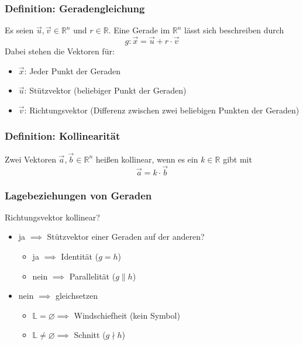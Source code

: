\documentclass{article}
\begin{document}
  \subsubsection{Definition: Geradengleichung}
  Es seien $\vec{u}, \vec{v} \in \mathbb{R}^n$ und $r \in \mathbb{R}$. Eine Gerade im $\mathbb{R}^n$ lässt sich beschreiben durch 
  \begin{equation*}
  	g : \vec{x} = \vec{u} + r \cdot \vec{v}
  \end{equation*}
  Dabei stehen die Vektoren für: 
  \begin{itemize}
  	\item $\vec{x}$: Jeder Punkt der Geraden
  	\item $\vec{u}$: Stützvektor (beliebiger Punkt der Geraden)
  	\item $\vec{v}$: Richtungsvektor (Differenz zwischen zwei beliebigen Punkten der Geraden)
  \end{itemize}
  
  \subsubsection{Definition: Kollinearität}
  Zwei Vektoren $\vec{a}, \vec{b} \in \mathbb{R}^n$ heißen kollinear, wenn es ein $k \in \mathbb{R}$ gibt mit 
  \begin{equation*}
  	\vec{a} = k \cdot \vec{b}
  \end{equation*}
  
  \subsubsection{Lagebeziehungen von Geraden}
  Richtungsvektor kollinear? 
  \begin{itemize}
  	\item ja $\implies$ Stützvektor einer Geraden auf der anderen? \\
  	\begin{itemize}
  		\item ja $\implies$ Identität ($g = h$)
  		\item nein $\implies$ Parallelität ($g \parallel h$)
  	\end{itemize}
  	\item nein $\implies$ gleichsetzen
  	\begin{itemize}
  		\item $\mathbb{L} = \varnothing \implies$ Windschiefheit (kein Symbol)
  		\item $\mathbb{L} \neq \varnothing \implies$ Schnitt ($g \nmid h$)
  	\end{itemize}
  \end{itemize}
  
\end{document}

